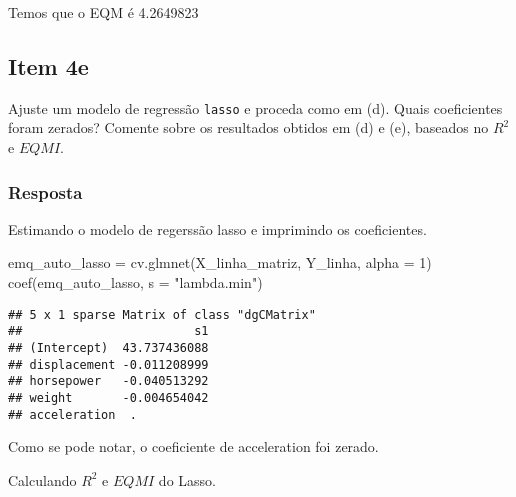 \documentclass[
]{article}
\newenvironment{Shaded}{\begin{snugshade}}{\end{snugshade}}
\newcommand{\AttributeTok}[1]{\textcolor[rgb]{0.77,0.63,0.00}{#1}}
\newcommand{\DecValTok}[1]{\textcolor[rgb]{0.00,0.00,0.81}{#1}}
\newcommand{\FunctionTok}[1]{\textcolor[rgb]{0.00,0.00,0.00}{#1}}
\newcommand{\NormalTok}[1]{#1}
\newcommand{\OtherTok}[1]{\textcolor[rgb]{0.56,0.35,0.01}{#1}}
\newcommand{\SpecialCharTok}[1]{\textcolor[rgb]{0.00,0.00,0.00}{#1}}
\newcommand{\StringTok}[1]{\textcolor[rgb]{0.31,0.60,0.02}{#1}}
\begin{document}
Temos que o EQM é 4.2649823

\hypertarget{item-4e}{%
\subsection{Item 4e}\label{item-4e}}

Ajuste um modelo de regressão \texttt{lasso} e proceda como em (d).
Quais coeficientes foram zerados? Comente sobre os resultados obtidos em
(d) e (e), baseados no \(R^2\) e \(EQMI\).

\hypertarget{resposta-10}{%
\subsubsection{Resposta}\label{resposta-10}}

Estimando o modelo de regerssão lasso e imprimindo os coeficientes.

\begin{Shaded}
\begin{Highlighting}[]
\NormalTok{emq\_auto\_lasso }\OtherTok{=} \FunctionTok{cv.glmnet}\NormalTok{(X\_linha\_matriz, Y\_linha, }\AttributeTok{alpha =} \DecValTok{1}\NormalTok{)}
\FunctionTok{coef}\NormalTok{(emq\_auto\_lasso, }\AttributeTok{s =} \StringTok{"lambda.min"}\NormalTok{)}
\end{Highlighting}
\end{Shaded}

\begin{verbatim}
## 5 x 1 sparse Matrix of class "dgCMatrix"
##                        s1
## (Intercept)  43.737436088
## displacement -0.011208999
## horsepower   -0.040513292
## weight       -0.004654042
## acceleration  .
\end{verbatim}

Como se pode notar, o coeficiente de acceleration foi zerado.

Calculando \(R^2\) e \(EQMI\) do Lasso.

\begin{Shaded}
\end{Shaded}
\end{document}
